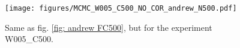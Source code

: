 \documentclass[draft]{agujournal2019}
\newcommand{\blu}[1]{{\color{BlueGreen} #1}}
\begin{document}
%
\begin{figure}
    \texttt{[image: figures/MCMC\_W005\_C500\_NO\_COR\_andrew\_N500.pdf]}
    \caption{Same as fig. \ref{fig: andrew FC500}, but for the experiment W005\_C500.}
    \label{fig: andrew WC500}
\end{figure}
%

%
%
\end{document}
